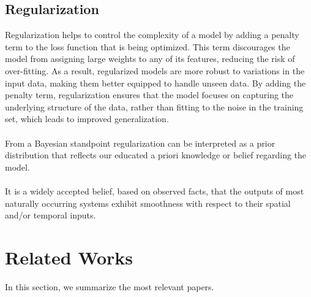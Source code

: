 \documentclass[paper=a4, fontsize=11pt]{scrartcl}
\numberwithin{equation}{section}		%
\numberwithin{figure}{section}			%
\numberwithin{table}{section}				%
\begin{document}
\subsection{Regularization}
Regularization helps to control the complexity of a model by adding a penalty term to the loss function that is being optimized. This term discourages the model from assigning large weights to any of its features, reducing the risk of over-fitting. As a result, regularized models are more robust to variations in the input data, making them better equipped to handle unseen data. By adding the penalty term, regularization ensures that the model focuses on capturing the underlying structure of the data, rather than fitting to the noise in the training set, which leads to improved generalization.
\\
\\
From a Bayesian standpoint regularization can be interpreted as a prior distribution that reflects our educated a priori knowledge or belief regarding the model. 
\\
\\
It is a widely accepted belief, based on observed facts, that the outputs of most naturally occurring systems exhibit smoothness with respect to their spatial and/or temporal inputs.

\section{Related Works}
In this section, we summarize the most relevant papers.
\end{document}
